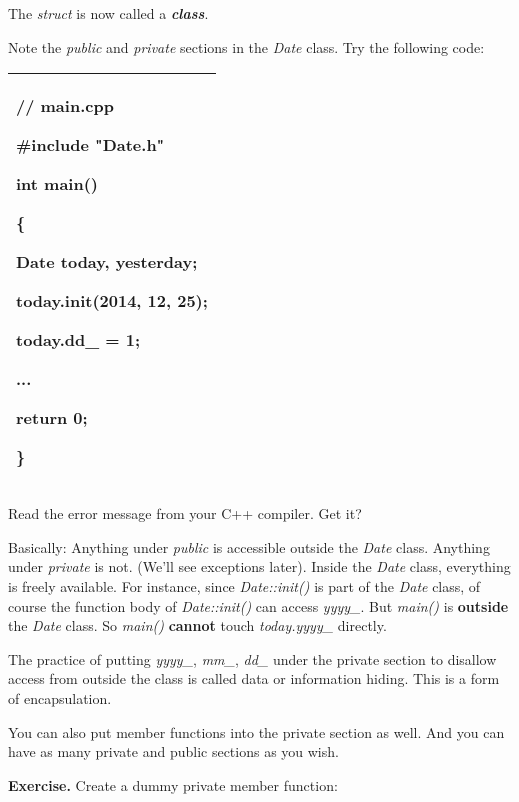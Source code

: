 \documentclass[
]{article}
\begin{document}
The \emph{struct} is now called a \emph{\textbf{class}}.

Note the \emph{public} and \emph{private} sections in the \emph{Date}
class. Try the following code:

\begin{longtable}[]{@{}l@{}}
\toprule
\endhead
\begin{minipage}[t]{0.97\columnwidth}\raggedright
// main.cpp

\#include "Date.h"

int main()

\{

Date today, yesterday;

today.init(2014, 12, 25);

\textbf{today.dd\_ = 1;}

...

return 0;

\}\strut
\end{minipage}\tabularnewline
\bottomrule
\end{longtable}

Read the error message from your C++ compiler. Get it?

Basically: Anything under \emph{public} is accessible outside the
\emph{Date} class. Anything under \emph{private} is not. (We'll see
exceptions later). Inside the \emph{Date} class, everything is freely
available. For instance, since \emph{Date::init()} is part of the
\emph{Date} class, of course the function body of \emph{Date::init()}
can access \emph{yyyy\_}. But \emph{main()} is \textbf{outside} the
\emph{Date} class. So \emph{main()} \textbf{cannot} touch
\emph{today.yyyy\_} directly.

The practice of putting \emph{yyyy\_}, \emph{mm\_}, \emph{dd\_} under
the private section to disallow access from outside the class is called
data or information hiding. This is a form of encapsulation.

You can also put member functions into the private section as well. And
you can have as many private and public sections as you wish.

\textbf{Exercise.} Create a dummy private member function:
\end{document}
